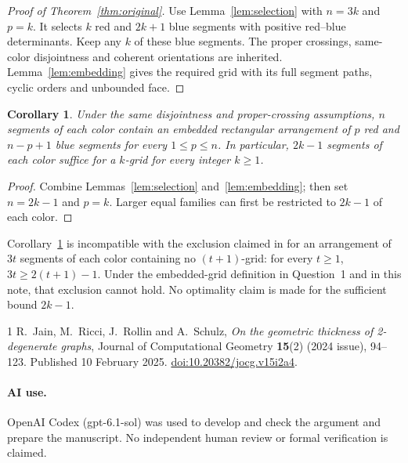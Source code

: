\documentclass[11pt]{article}
\newtheorem{corollary}[theorem]{Corollary}
\begin{document}
\begin{proof}[Proof of Theorem~\ref{thm:original}]
Use Lemma~\ref{lem:selection} with \(n=3k\) and \(p=k\).
It selects \(k\) red and \(2k+1\) blue segments with positive
red--blue determinants. Keep any \(k\) of these blue segments.
The proper crossings, same-color disjointness and coherent orientations
are inherited. Lemma~\ref{lem:embedding} gives the required grid
with its full segment paths, cyclic orders and unbounded face.
\end{proof}

\begin{corollary}\label{cor:stronger}
Under the same disjointness and proper-crossing assumptions, \(n\)
segments of each color contain an embedded rectangular arrangement of
\(p\) red and \(n-p+1\) blue segments for every \(1\leq p\leq n\).
In particular, \(2k-1\) segments of each color suffice for a \(k\)-grid
for every integer \(k\geq1\).
\end{corollary}
\begin{proof}
Combine Lemmas~\ref{lem:selection} and~\ref{lem:embedding}; then set
\(n=2k-1\) and \(p=k\). Larger equal families can first be restricted
to \(2k-1\) of each color.
\end{proof}

Corollary~\ref{cor:stronger} is incompatible with the exclusion claimed
in \cite[Figure~26]{JRRS} for an arrangement of \(3t\) segments of each
color containing no \((t+1)\)-grid: for every \(t\geq1\),
\(3t\geq2(t+1)-1\). Under the embedded-grid definition in
Question~1 and in this note, that exclusion cannot hold.
No optimality claim is made for the sufficient bound \(2k-1\).

\begin{thebibliography}{1}
R.~Jain, M.~Ricci, J.~Rollin and A.~Schulz,
\emph{On the geometric thickness of 2-degenerate graphs},
Journal of Computational Geometry \textbf{15}(2) (2024 issue), 94--123.
Published 10 February 2025.
\href{https://doi.org/10.20382/jocg.v15i2a4}{doi:10.20382/jocg.v15i2a4}.
\end{thebibliography}

\paragraph{AI use.}
OpenAI Codex (gpt-6.1-sol) was used to develop and check the argument
and prepare the manuscript. No independent human review or formal
verification is claimed.
\end{document}
